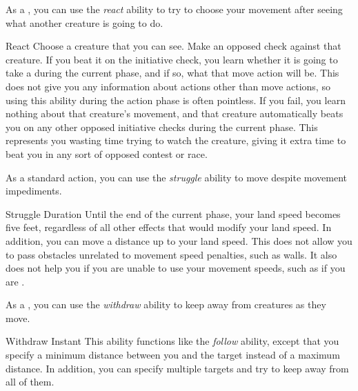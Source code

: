          As a , you can use the \textit{react} ability to try to choose your movement after seeing what another creature is going to do.

        \begin{instantability}{React}
            \label{React}
            \rankline
            Choose a creature that you can see.
            Make an opposed  check against that creature.
            If you beat it on the initiative check, you learn whether it is going to take a  during the current phase, and if so, what that move action will be.
            This does not give you any information about actions other than move actions, so using this ability during the action phase is often pointless.
            If you fail, you learn nothing about that creature's movement, and that creature automatically beats you on any other opposed initiative checks during the current phase.
            This represents you wasting time trying to watch the creature, giving it extra time to beat you in any sort of opposed contest or race.
        \end{instantability}

         As a standard action, you can use the \textit{struggle} ability to move despite movement impediments.

        \begin{durationability}{Struggle}
            \label{Struggle}
            Duration
            \rankline
            Until the end of the current phase, your land speed becomes five feet, regardless of all other effects that would modify your land speed.
            In addition, you can move a distance up to your land speed.
            This does not allow you to pass obstacles unrelated to movement speed penalties, such as walls.
            It also does not help you if you are unable to use your movement speeds, such as if you are \immobilized.
        \end{durationability}

         As a , you can use the \textit{withdraw} ability to keep away from creatures as they move.

        \begin{instantability}{Withdraw}
            \label{Withdraw}
            Instant
            \rankline
            This ability functions like the \textit{follow} ability, except that you specify a minimum distance between you and the target instead of a maximum distance.
            In addition, you can specify multiple targets and try to keep away from all of them.
        \end{instantability}

